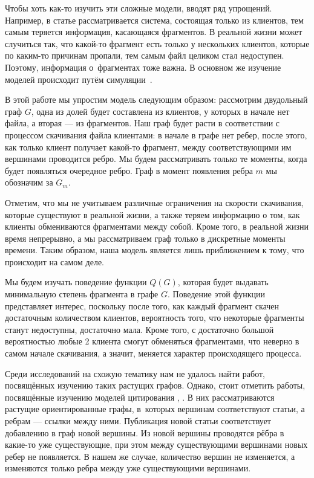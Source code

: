 \documentclass{matmex-diploma-custom}
\theoremstyle{named}
\begin{document}
Чтобы хоть как-то изучить эти сложные модели, вводят ряд упрощений.
Например, в статье \cite{cool} рассматривается система, состоящая только из клиентов, 
тем самым теряется информация, касающаяся фрагментов.
В реальной жизни может случиться так, что какой-то фрагмент есть только у нескольких клиентов, которые
по каким-то причинам пропали, тем самым файл целиком стал недоступен.
Поэтому, информация о~фрагментах тоже важна. 
В основном же изучение моделей происходит путём симуляции~\cite{unavalib}.


В этой работе мы упростим модель следующим образом: рассмотрим двудольный граф $G$, 
одна из долей будет составлена из клиентов, у которых в начале нет файла, а вторая --- из фрагментов. 
Наш граф будет расти в соответствии с процессом скачивания файла клиентами: в начале в графе нет ребер,
после этого, как только клиент получает какой-то фрагмент, между соответствующими им вершинами проводится ребро.
Мы будем рассматривать только те моменты, когда будет появляться очередное ребро.
Граф в момент появления ребра $m$ мы обозначим за $G_m$.

Отметим, что мы не учитываем различные ограничения на скорости скачивания, которые существуют в реальной жизни, 
а также теряем информацию о том, как клиенты обмениваются фрагментами между собой.
Кроме того, в реальной жизни время непрерывно, а мы рассматриваем граф только в дискретные моменты времени.
Таким образом, наша модель является лишь приближением к тому, что происходит на самом деле.

Мы будем изучать поведение функции $Q(G)$, которая будет выдавать минимальную степень фрагмента в графе $G$.
Поведение этой функции представляет интерес, поскольку после того, как каждый фрагмент скачен достаточным количеством клиентов,
вероятность того, что некоторые фрагменты станут недоступны, достаточно мала. 
Кроме того, с достаточно большой вероятностью любые 2 клиента смогут обменяться фрагментами, 
что неверно в самом начале скачивания, а значит, меняется характер происходящего процесса.

Среди исследований на схожую тематику нам не удалось найти работ, посвящённых изучению таких растущих графов.
Однако, стоит отметить работы, посвящённые изучению моделей цитирования \cite{price}, \cite{newman}. 
В них рассматриваются растущие ориентированные графы, в~которых вершинам соответствуют статьи, а ребрам --- ссылки между ними. 
Публикация новой статьи соответствует добавлению в граф новой вершины.
Из новой вершины проводятся рёбра в какие-то уже существующие, при этом между существующими вершинами новых ребер не появляется.
В нашем же случае, количество вершин не изменяется, а изменяются только ребра между уже существующими вершинами.
\end{document}
